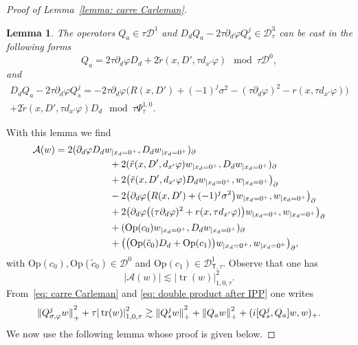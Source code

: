 \documentclass[JEP,XML,SOM,Unicode,published]{cedram}
\theoremstyle{plain}
\newtheorem{lemma}[theorem]{Lemma}
\theoremstyle{definition}
\let \Re \relax
\DeclareMathOperator{\Re}{Re}
\newcommand{\inp}[2]{(#1, #2)}
\newcommand{\biginp}[2]{\big(#1, #2 \big)}
\newcommand{\br}{\ensuremath{_{|x_d=0^+}}}
\newcommand{\Op}{\ensuremath{\mathrm{Op}}}
\newcommand{\Norm}[2]{{\| #1 \|}_{#2}}
\newcommand{\normsc}[2]{{| #1 |}_{#2, \tau}}
\newcommand{\Psisc}{\Psi_\tau}
\newcommand{\Dsc}{\mathscr{D}_{\tau}}
\newcommand{\Dsct}{\mathscr{D}_{{\scriptscriptstyle{\mathsf T}},\tau}}
\newcommand{\Qconj}{Q_{\sigma,\varphi}}
\newcommand{\Qs}{Q_{s}}
\newcommand{\Qa}{Q_{a}}
\DeclareMathOperator{\trace}{tr}
\begin{document}
\begin{proof}[Proof of Lemma~\ref{lemma: carre Carleman}]
\begin{lemma}
\label{lemma: quadratic form at the boundary}
The operators $\Qa \in \tau \mathscr D^1$ and $D_d\Qa-2\tau \partial_d\varphi
\Qs^j \in
\Dsc^3$ can be cast in the following forms
\begin{equation*}
\Qa = 2 \tau \partial_d\varphi D_d + 2 \tilde{r} (x,D',\tau d_{x'}\varphi)
\mod \tau \mathscr D^0,
\end{equation*}
and
\begin{multline*}
D_d \Qa-2\tau \partial_d\varphi \Qs^j= - 2 \tau \partial_d\varphi
\big(R(x,D') + (-1)^j\sigma^2
-(\tau\partial_d\varphi)^2-r(x,\tau d_{x'}\varphi) \big)\\
+ 2 \tilde{r} (x,D',\tau d_{x'} \varphi) D_d
\mod \tau \Psisc^{1,0}.
\end{multline*}
\end{lemma}
With this lemma we find
\begin{equation}\label{mb0}
\begin{split}
\mathcal{A}(w) &=2 \inp{\partial_d\varphi D_d w\br}{D_dw\br}_\partial\\
&\hspace*{2cm} + 2 \inp{\tilde{r} (x,D', d_{x'}\varphi) w\br}{D_dw\br}_\partial\\
& \hspace*{2cm} + 2 \biginp{ \tilde{r} (x,D', d_{x'} \varphi) D_d
w\br}{w\br}_\partial\\
&\hspace*{2cm} - 2 \biginp{ \partial_d\varphi
\big(R(x,D') +(-1)^j \sigma^2\big)
w\br}{w\br}_\partial\\
&\hspace*{2cm} + 2 \biginp{ \partial_d\varphi
\big((\tau\partial_d\varphi)^2+r(x,\tau d_{x'}\varphi)\big)
w\br}{w\br}_\partial\\
& \hspace*{2cm}
+ \inp{\Op(c_0) w\br}{ D_dw\br}_\partial\\
& \hspace*{2cm}+ \biginp{ \big(\Op(\tilde{c}_0) D_d+ \Op(c_1)\big) w\br}{w\br}_\partial,
\end{split}
\end{equation}
with $\Op(c_0), \Op(\tilde{c}_0) \in \mathscr D^0$ and $\Op(c_1) \in \Dsct^1$.
Observe that one has
\begin{equation}\label{nn1}
|\mathcal{A}(w)|\lesssim \normsc{\trace(w)}{1,0}^2.
\end{equation}
From~\eqref{eq: carre Carleman} and \eqref{eq: double product after IPP} one writes
\begin{equation}
\label{eq: carre Carleman-bis}
\Norm{\Qconj^j w}{+}^2 + \tau \normsc{\trace(w)}{1,0}^2
\gtrsim \Norm{\Qs^j w}{+}^2 +\Norm{\Qa w}{+}^2
+\Re \inp{i [\Qs^j,\Qa]w}{w}_+.
\end{equation}
We now use the following lemma whose proof is given below.


\end{proof}
\end{document}
